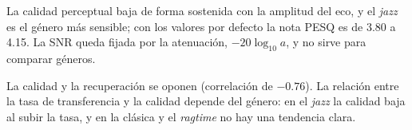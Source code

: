La calidad perceptual baja de forma sostenida con la amplitud del eco, y el
\textit{jazz} es el género más sensible; con los valores por defecto la nota PESQ
es de 3.80 a 4.15. La SNR
queda fijada por la atenuación, $-20\log_{10} a$, y no sirve para comparar
géneros.

La calidad y la recuperación se oponen (correlación de $-0.76$). La relación entre la tasa de transferencia y la calidad depende del
género: en el \textit{jazz} la calidad baja al subir la tasa, y en la clásica y
el \textit{ragtime} no hay una tendencia clara.
